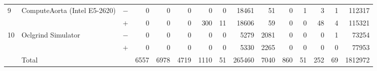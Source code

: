 \begin{tabular}{lll | rrrrrr | rrrrrr }
\hline
\multirow{ 2}{*}{9} & \multirow{ 2}{*}{ComputeAorta (Intel E5-2620)} & $-$ & 0 & 0 & 0 & 0 & 0 & 18461       & 51 & 0 & 1 & 3 & 1 & 112317 \\& & $+$ & 0 & 0 & 0 & 300 & 11 & 18606 & 59 & 0 & 0 & 48 & 4 & 115321 \\
\hline
\multirow{ 2}{*}{10} & \multirow{ 2}{*}{Oclgrind Simulator} & $-$ & 0 & 0 & 0 & 0 & 0 & 5279       & 2081 & 0 & 0 & 0 & 1 & 73254 \\& & $+$ & 0 & 0 & 0 & 0 & 0 & 5330 & 2265 & 0 & 0 & 0 & 0 & 77953 \\
  \midrule
  
\multirow{ 2}{*}{} & \multirow{ 2}{*}{Total} & \multirow{ 2}{*}{} &
\multirow{ 2}{*}{6557} & \multirow{ 2}{*}{6978} & \multirow{ 2}{*}{4719} & \multirow{ 2}{*}{1110} & \multirow{ 2}{*}{51} & \multirow{ 2}{*}{265460} & \multirow{ 2}{*}{7040} & \multirow{ 2}{*}{860} & \multirow{ 2}{*}{51} & \multirow{ 2}{*}{252} & \multirow{ 2}{*}{69} & \multirow{ 2}{*}{1812972} \\
\\

  \bottomrule
\end{tabular}

